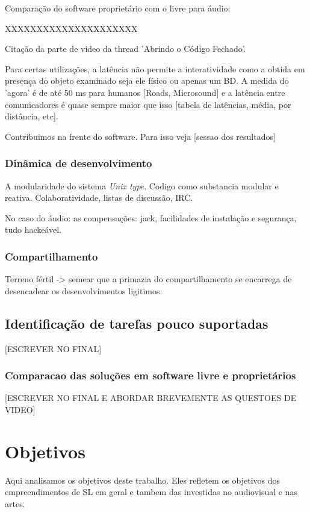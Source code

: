 	  Comparação do software proprietário com o livre para áudio:

	  XXXXXXXXXXXXXXXXXXXXX

	  Citação da parte de video da thread 'Abrindo o Código Fechado'.

	  Para certas utilizações, a latência não permite a interatividade como 
	  a obtida em presença do objeto examinado seja ele físico ou apenas um BD.
	  A medida do 'agora' é de até 50 ms para humanos [Roads, Microsound] e a latência entre comunicadores é
	  quase sempre maior que isso [tabela de latências, média, por distância, etc].

	  Contribuimos na frente do software. Para isso veja [sessao dos resultados]


	  \subsubsection{Dinâmica de desenvolvimento}
	  \label{sec:din_dev}
	  A modularidade do sistema \emph{Unix type}. Codigo como substancia modular
	  e reativa. Colaboratividade, listas de discussão, IRC.

	  No caso do áudio: as compensações: jack,
	  facilidades de instalação e segurança, tudo hackeável.

	  \subsubsection{Compartilhamento}
	  \label{sec:comp_tec}
	  Terreno fértil -> semear que a primazia do compartilhamento se encarrega de
	  desencadear os desenvolvimentos ligitimos.

      \subsection{Identificação de tarefas pouco suportadas}
      \label{sec:tarefas_n_sup}
  [ESCREVER NO FINAL]

	  \subsubsection{Comparacao das soluções em software livre e proprietários}
	  \label{sec:sl_prop}
      [ESCREVER NO FINAL E ABORDAR BREVEMENTE AS QUESTOES DE VIDEO]



\section{Objetivos}
\label{sec:objetivos}
Aqui analisamos os objetivos deste trabalho. Eles refletem os objetivos
dos empreendimentos de SL em geral e tambem das investidas no audiovisual e nas artes.

